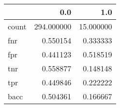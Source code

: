 \begin{tabular}{lrr}
\toprule
{} &         0.0 &        1.0 \\
\midrule
count &  294.000000 &  15.000000 \\
fnr   &    0.550154 &   0.333333 \\
fpr   &    0.441123 &   0.518519 \\
tnr   &    0.558877 &   0.148148 \\
tpr   &    0.449846 &   0.222222 \\
bacc  &    0.504361 &   0.166667 \\
\bottomrule
\end{tabular}
